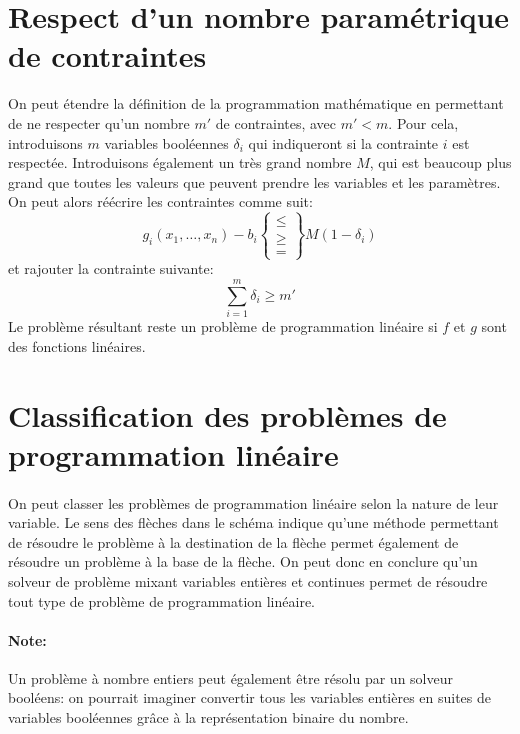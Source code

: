 \documentclass[a4paper]{report}
\begin{document}
\section{Respect d'un nombre paramétrique de contraintes}
On peut étendre la définition de la programmation mathématique en permettant
de ne respecter qu'un nombre \(m'\) de contraintes, avec \(m'<m\).
Pour cela, introduisons \(m\) variables booléennes \(\delta_i\) qui indiqueront
si la contrainte \(i\) est respectée. Introduisons également un très grand nombre \(M\),
qui est beaucoup plus grand que toutes les valeurs que peuvent prendre les variables
et les paramètres. On peut alors réécrire les contraintes comme suit:
\[g_i(x_1,\dots,x_n)-b_i\begin{Bmatrix}\le\\\ge\\=\end{Bmatrix}M(1-\delta_i)\]
et rajouter la contrainte suivante:
\[\sum_{i=1}^{m}\delta_i\ge m'\]
Le problème résultant reste un problème de programmation linéaire si \(f\) et
\(g\) sont des fonctions linéaires.

\section{Classification des problèmes de programmation linéaire}

\paragraph{}On peut classer les problèmes de programmation linéaire selon la nature de leur variable. Le sens des flèches dans le schéma indique qu'une méthode permettant de résoudre le problème à la destination de la flèche permet également de résoudre un problème à la base de la flèche. On peut donc en conclure qu'un solveur de problème mixant variables entières et continues permet de résoudre tout type de problème de programmation linéaire.

\paragraph{Note:}Un problème à nombre entiers peut également être résolu par un solveur booléens: on pourrait imaginer convertir tous les variables entières en suites de variables booléennes grâce à la représentation binaire du nombre.
\end{document}
